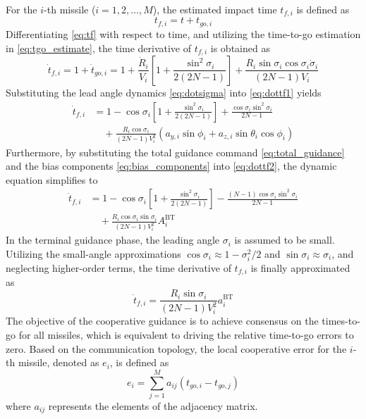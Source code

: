 \documentclass[lettersize,journal]{IEEEtran}
\begin{document}
For the $i$-th missile ($i=1, 2, \dots, M$), the estimated impact time $t_{f,i}$ is defined as
\begin{equation}
	\label{eq:tf}
	t_{f,i} = t + t_{go,i}
\end{equation}
Differentiating \eqref{eq:tf} with respect to time, and utilizing the time-to-go estimation in \eqref{eq:tgo_estimate}, the time derivative of $t_{f,i}$ is obtained as
\begin{equation}
	\label{eq:dottf1}
	\dot{t}_{f,i} = 1 + \dot{t}_{go,i} = 1 + \frac{\dot{R}_i}{V_i}\left[1 + \frac{\sin^2\sigma_i}{2(2N-1)}\right] + \frac{R_i\sin\sigma_i\cos\sigma_i\dot{\sigma}_i}{(2N-1)V_i}
\end{equation}    
Substituting the lead angle dynamics \eqref{eq:dotsigma} into \eqref{eq:dottf1} yields
\begin{equation}
	\label{eq:dottf2}
	\begin{split}
		\dot{t}_{f, i} &= 1-\cos\sigma_{i}\left[1+\frac{\sin ^{2}\sigma_{i}}{2(2N-1)}\right]+\frac{\cos\sigma_{i}\sin ^{2}\sigma_{i}}{2 N-1}\\
		&\quad +\frac{R_{i}\cos\sigma_{i}}{(2 N-1)V_{i}^{2}}\left(a_{y, i}\sin\phi_{i}+a_{z, i}\sin\theta_{i}\cos\phi_{i}\right)
	\end{split}
\end{equation}
Furthermore, by substituting the total guidance command \eqref{eq:total_guidance} and the bias components \eqref{eq:bias_components} into \eqref{eq:dottf2}, the dynamic equation simplifies to
\begin{equation}
	\begin{split}
		\dot{t}_{f, i} &= 1-\cos\sigma_{i}\left[1+\frac{\sin ^{2}\sigma_{i}}{2(2N-1)}\right]-\frac{(N-1)\cos\sigma_{i}\sin ^{2}\sigma_{i}}{2N-1}\\
		&\quad +\frac{R_{i}\cos\sigma_{i}\sin\sigma_{i}}{(2N-1)V_{i}^{2}}A_{i}^{\mathrm{BT}}
	\end{split}
\end{equation}
In the terminal guidance phase, the leading angle $\sigma_i$ is assumed to be small. Utilizing the small-angle approximations $\cos \sigma_i \approx 1 - \sigma_i^2/2$ and $\sin \sigma_i \approx \sigma_i$, and neglecting higher-order terms, the time derivative of $t_{f,i}$ is finally approximated as
\begin{equation}
	\label{eq:dottfabt}
	\dot{t}_{f, i} = \frac{R_{i}\sin\sigma_{i}}{(2 N-1)V_{i}^{2}}a_{i}^{\mathrm{BT}}
\end{equation}
The objective of the cooperative guidance is to achieve consensus on the times-to-go for all missiles, which is equivalent to driving the relative time-to-go errors to zero. Based on the communication topology, the local cooperative error for the $i$-th missile, denoted as $e_i$, is defined as
\begin{equation}
	\label{eq:consensus_error}
	e_i = \sum_{j=1}^{M} a_{ij}(t_{go,i} - t_{go,j})
\end{equation}
where $a_{ij}$ represents the elements of the adjacency matrix.
\end{document}
